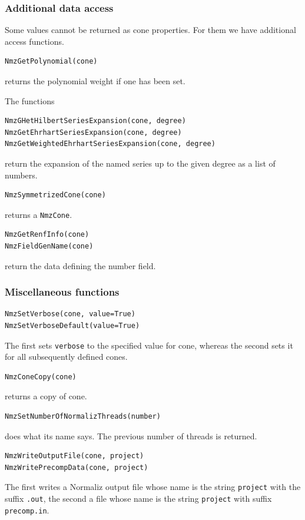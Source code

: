 \begin{small}
\subsubsection{Additional data access}\label{add_data}

Some values cannot be returned as cone properties. For them we have additional access functions.

\begin{Verbatim}
NmzGetPolynomial(cone)
\end{Verbatim}
returns the polynomial weight if one has been set.

The functions
\begin{Verbatim}
NmzGHetHilbertSeriesExpansion(cone, degree)
NmzGetEhrhartSeriesExpansion(cone, degree)
NmzGetWeightedEhrhartSeriesExpansion(cone, degree)
\end{Verbatim}
return the expansion of the named series up to the given degree as a list of numbers.

\begin{Verbatim}
NmzSymmetrizedCone(cone)
\end{Verbatim}
returns a \verb|NmzCone|.

\begin{Verbatim}
NmzGetRenfInfo(cone)
NmzFieldGenName(cone)
\end{Verbatim}
return the data defining the number field.

\subsubsection{Miscellaneous functions}

\begin{Verbatim}
NmzSetVerbose(cone, value=True)
NmzSetVerboseDefault(value=True)
\end{Verbatim}
The first sets \verb|verbose| to the specified value for cone, whereas the second sets it for all subsequently defined cones.

\begin{Verbatim}
NmzConeCopy(cone)
\end{Verbatim}
returns a copy of cone.

\begin{Verbatim}
NmzSetNumberOfNormalizThreads(number)
\end{Verbatim}
does what its name says. The previous number of threads is returned.

\begin{Verbatim}
NmzWriteOutputFile(cone, project)
NmzWritePrecompData(cone, project)
\end{Verbatim}
The first writes a Normaliz output file whose name is the string \verb|project| with the suffix \verb|.out|, the second a file whose name is the string \verb|project| with suffix \verb|precomp.in|.



\end{small}
